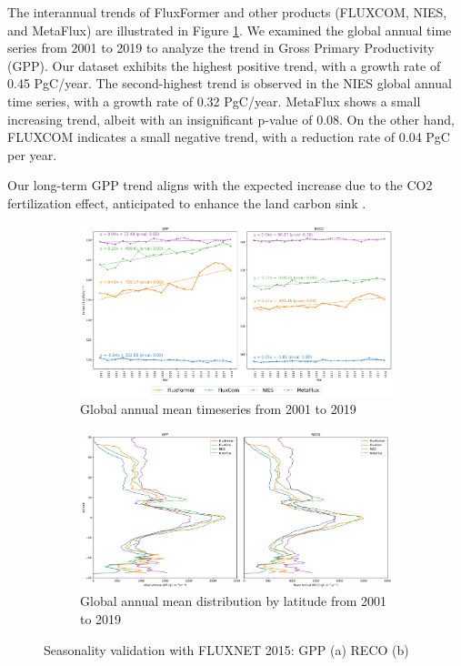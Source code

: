 The interannual trends of FluxFormer and other products (FLUXCOM, NIES, and MetaFlux) are illustrated in Figure \ref{fig:chap6_fig7a}. We examined the global annual time series from 2001 to 2019 to analyze the trend in Gross Primary Productivity (GPP). Our dataset exhibits the highest positive trend, with a growth rate of 0.45 PgC/year. The second-highest trend is observed in the NIES global annual time series, with a growth rate of 0.32 PgC/year. MetaFlux shows a small increasing trend, albeit with an insignificant p-value of 0.08. On the other hand, FLUXCOM indicates a small negative trend, with a reduction rate of 0.04 PgC per year.\par

Our long-term GPP trend aligns with the expected increase due to the CO2 fertilization effect, anticipated to enhance the land carbon sink \citep{piao2020characteristics, guo2023estimating, yang2022divergent}.\par
\begin{figure}[p]
    \centering
    \begin{subfigure}{\textwidth}
      \centering
      \includegraphics[width=\textwidth]{figs/chap6/global_annual_timeseries.png}
      \caption{Global annual mean timeseries from 2001 to 2019}
      \label{fig:chap6_fig7a}
    \end{subfigure}

    \begin{subfigure}{\textwidth}
      \centering
      \includegraphics[width=\textwidth]{figs/chap6/lat_mean.png}
      \caption{Global annual mean distribution by latitude from 2001 to 2019}
      \label{fig:chap6_fig7b}
    \end{subfigure}
    \caption[Seasonality validation with FLUXNET 2015]{Seasonality validation with FLUXNET 2015: GPP (a) RECO (b)}
    \label{fig:chap6_fig7}
\end{figure}

